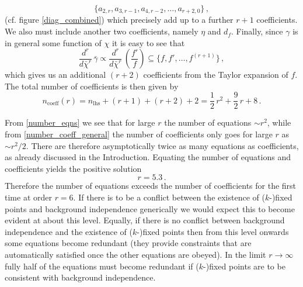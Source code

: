 \documentclass[11pt]{book} %
\begin{document}
\begin{equation}
\bigg\lbrace a_{2,r}, a_{3,r-1}, a_{4,r-2}, \dots, a_{r+2,0}   \bigg\rbrace \,,
\end{equation}
(cf. figure \ref{diag_combined}) which precisely add up to a further $r+1$ coefficients. We also must include another two coefficients, namely $\eta$ and $d_f$. 
Finally, since $\gamma$ is in general some function of $\chi$ it is easy to see that
\begin{equation}
\frac{d^r}{d \bar\chi^r} \, \bar{\gamma} \propto \frac{d^r}{d \bar\chi^r} \, \left( \frac{f'}{f}\right) \subseteq
\bigg\lbrace f, f', \dots, f^{(r+1)}   \bigg\rbrace \,,
\end{equation}
which gives us an additional $(r+2)$ coefficients from the Taylor expansion of $f$. The total number of coefficients is then given by
\begin{equation}
\label{number_coeff_general}
n_{\text{coeff}}(r) = n_{\text{lhs}} + (r+1) + (r+2) + 2  = \frac{1}{2} \, r^2 + \frac{9}{2} \, r + 8 \,.
\end{equation}

From \eqref{number_eqns} we see that for large $r$ the number of equations $\sim r^2$, while from \eqref{number_coeff_general} the number of coefficients only goes for large $r$ as $\sim r^2/2$. There are therefore asymptotically twice as many equations as coefficients, as already discussed in the Introduction. 
Equating the number of equations and coefficients yields the positive solution
\begin{equation}
r = 5.3 \,.
\end{equation}
Therefore the number of equations exceeds the number of coefficients for the first time at order $r=6$. If there is to be a conflict between the existence of ($k$-)fixed points and background independence generically we would expect this to become evident at about this level.  Equally, if there is no conflict between background independence and the existence of ($k$-)fixed points then from this level onwards some equations become redundant (\ie they provide constraints that are automatically satisfied once the other equations are obeyed). In the limit $r\to\infty$ fully half of the equations must become redundant if ($k$-)fixed points are to be consistent with background independence.
\end{document}
